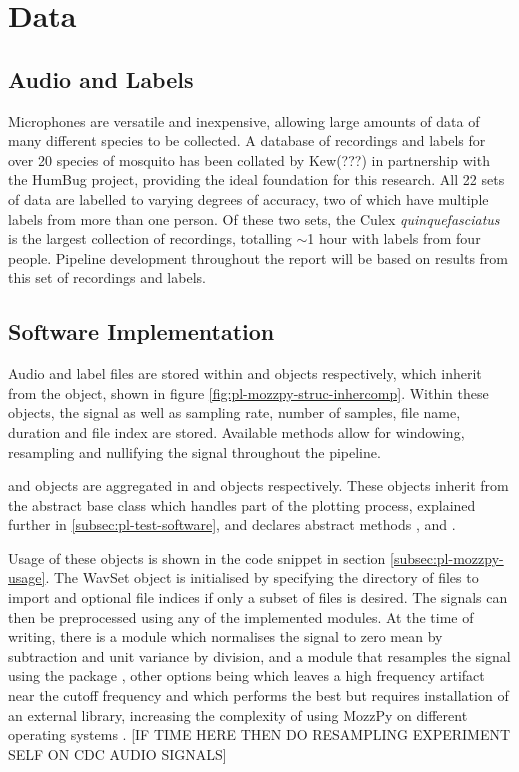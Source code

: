 \section{Data}
\label{sec:pl-data}

    \subsection{Audio and Labels}
    \label{subsec:pl-data-audiolbls}
        Microphones are versatile and inexpensive, allowing large amounts of data of many different species to be collected. A database of recordings and labels for over 20 species of mosquito has been collated by Kew(???) in partnership with the HumBug project, providing the ideal foundation for this research. All 22 sets of data are labelled to varying degrees of accuracy, two of which have multiple labels from more than one person. Of these two sets, the Culex \textit{quinquefasciatus} is the largest collection of recordings, totalling $\sim$1 hour with labels from four people. Pipeline development throughout the report will be based on results from this set of recordings and labels.
        
    \subsection{Software Implementation}
    \label{subsec:pl-data-software}
        Audio and label files are stored within  and  objects respectively, which inherit from the  object, shown in figure \ref{fig:pl-mozzpy-struc-inhercomp}. Within these objects, the signal as well as sampling rate, number of samples, file name, duration and file index are stored. Available methods allow for windowing, resampling and nullifying the signal throughout the pipeline. 
        
         and  objects are aggregated in  and  objects respectively. These objects inherit from the abstract base class  which handles part of the plotting process, explained further in \ref{subsec:pl-test-software}, and declares abstract methods ,  and .
        
        Usage of these objects is shown in the code snippet in section \ref{subsec:pl-mozzpy-usage}. The WavSet object is initialised by specifying the directory of  files to import and optional file indices if only a subset of files is desired. The signals can then be preprocessed using any of the implemented modules. At the time of writing, there is a  module which normalises the signal to zero mean by subtraction and unit variance by division, and a  module that resamples the signal using the  package \cite{BrianMcFee}, other options being  \cite{ScipyCommunity} which leaves a high frequency artifact near the cutoff frequency and  \cite{DavidCournapeau} which performs the best but requires installation of an external library, increasing the complexity of using MozzPy on different operating systems \cite{Thiemann}. [IF TIME HERE THEN DO RESAMPLING EXPERIMENT SELF ON CDC AUDIO SIGNALS]
        
